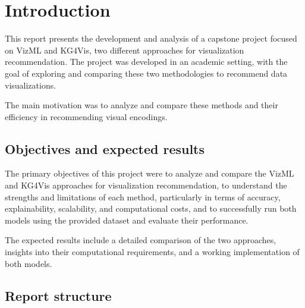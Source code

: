 \section{Introduction}


    
This report presents the development and analysis of a capstone project focused on VizML and KG4Vis, two different approaches for visualization recommendation. The project was developed in an academic setting, with the goal of exploring and comparing these two methodologies to recommend data visualizations. 

The main motivation was to analyze and compare these methods and their efficiency in recommending visual encodings.


	
\subsection{Objectives and expected results}
The primary objectives of this project were to analyze and compare the VizML and KG4Vis approaches for visualization recommendation, to understand the strengths and limitations of each method, particularly in terms of accuracy, explainability, scalability, and computational costs, and to successfully run both models using the provided dataset and evaluate their performance.

The expected results include a detailed comparison of the two approaches, insights into their computational requirements, and a working implementation of both models.	

\subsection{Report structure}

